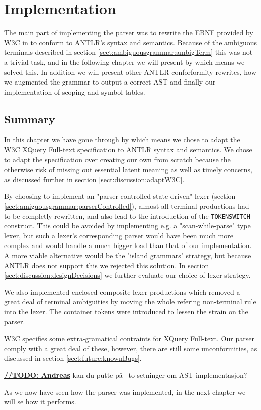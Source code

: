 \chapter{Implementation}


The main part of implementing the parser was to rewrite the EBNF provided by W3C in \cite{w3c01} to conform to ANTLR's syntax and semantics. Because of the ambiguous terminals described in section \ref{sect:ambiguousgrammar:ambigTerm} this was not a trivial task, and in the following chapter we will present by which means we solved this. In addition we will present other ANTLR conforformity rewrites, how we augmented the grammar to output a correct AST and finally our implementation of scoping and symbol tables.









\section{Summary}
In this chapter we have gone through by which means we chose to adapt the W3C XQuery Full-text specification to ANTLR syntax and semantics. We chose to adapt the specification over creating our own from scratch because the otherwise risk of missing out essential latent meaning as well as timely concerns, as discussed further in section \ref{sect:discussion:adaptW3C}.

By choosing to implement an "parser controlled state driven" lexer (section \ref{sect:amiguousgrammar:parserControlled}), almost all terminal productions had to be completly rewritten, and also lead to the introduction of the \verb!TOKENSWITCH! construct. This could be avoided by implementing e.g. a "scan-while-parse" type lexer, but such a lexer's corresponding parser would have been much more complex and would handle a much bigger load than that of our implementation. A more viable alternative would be the "island grammars" strategy, but because ANTLR does not support this we rejected this solution. In section \ref{sect:discussion:designDecisions} we further evaluate our choice of lexer strategy.

We also implemented enclosed composite lexer productions which removed a great deal of terminal ambiguities by moving the whole refering non-terminal rule into the lexer. The container tokens were introduced to lessen the strain on the parser.

W3C specifies some extra-gramatical contraints for XQuery Full-text. Our parser comply with a great deal of these, however, there are still some unconformities, as discussed in section \ref{sect:future:knownBugs}.

\underline{\textbf{\LARGE //TODO: Andreas}} kan du putte p\aa~ to setninger om AST implementasjon?

As we now have seen how the parser was implemented, in the next chapter we will se how it performs.